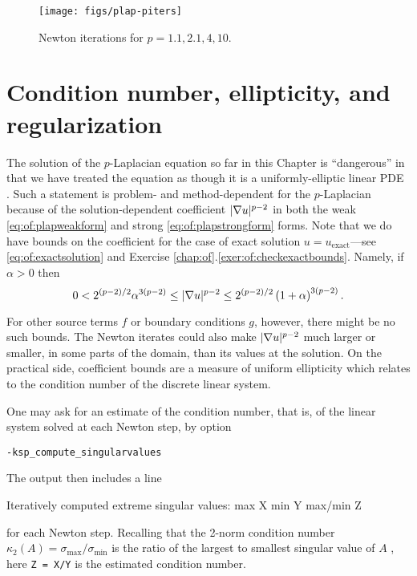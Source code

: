 \begin{figure}
\texttt{[image: figs/plap-piters]}
\caption{Newton iterations for $p=1.1,2.1,4,10$.}
\label{fig:of:plap-piters}
\end{figure}


\section{Condition number, ellipticity, and regularization}  \label{page:of:condellip}

The solution of the $p$-Laplacian equation so far in this Chapter is ``dangerous'' in that we have treated the equation as though it is a uniformly-elliptic linear PDE \citep{Evans2010}.  Such a statement is problem- and method-dependent for the $p$-Laplacian because of the solution-dependent coefficient $|\nabla u|^{p-2}$ in both the weak \eqref{eq:of:plapweakform} and strong \eqref{eq:of:plapstrongform} forms.  Note that we do have bounds on the coefficient for the case of exact solution $u=u_{\text{exact}}$---see \eqref{eq:of:exactsolution} and Exercise \ref{chap:of}.\ref{exer:of:checkexactbounds}.  Namely, if $\alpha>0$ then
\begin{equation}
0 < 2^{(p-2)/2} \alpha^{3(p-2)} \le |\nabla u|^{p-2} \le 2^{(p-2)/2} \left(1+\alpha\right)^{3(p-2)}.  \label{eq:of:coeffbounds}
\end{equation}

For other source terms $f$ or boundary conditions $g$, however, there might be no such bounds.  The Newton iterates could also make $|\nabla u|^{p-2}$ much larger or smaller, in some parts of the domain, than its values at the solution.  On the practical side, coefficient bounds are a measure of uniform ellipticity which relates to the condition number of the discrete linear system.

One may ask \PETSc for an estimate of the condition number, that is, of the linear system solved at each Newton step, by option

\centerline{\texttt{-ksp\_compute\_singularvalues}}

\noindent The output then includes a line
\begin{code}
Iteratively computed extreme singular values: max X min Y max/min Z
\end{code}
for each Newton step.  Recalling that the 2-norm condition number $\kappa_2(A)=\sigma_{\text{max}}/\sigma_{\text{min}}$ is the ratio of the largest to smallest singular value of $A$ \citep{TrefethenBau1997}, here \texttt{Z = X/Y} is the estimated condition number.

